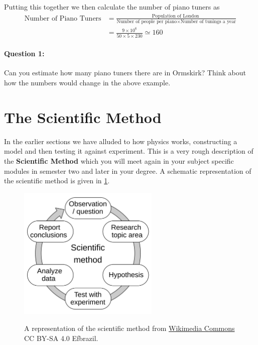 \documentclass[a4paper,12pt]{book}
\begin{document}
Putting this together we then calculate the number of piano tuners as
\begin{align*}
    \text{Number of Piano Tuners} &= \frac{\text{Population of London }}{\text{Number of people per piano} \times \text{Number of tunings a year}}\\
    &=\frac{9\times 10^{6}}{50\times 5\times 230}\simeq 160
\end{align*}

\paragraph{Question 1:}Can you estimate how many piano tuners there are in Ormskirk? Think about how the numbers would change in the above example.\\




\section{The Scientific Method}

In the earlier sections we have alluded to how physics works, constructing a model and then testing it against experiment. This is a very rough description of the \textbf{Scientific Method} which you will meet again in your subject specific modules in semester two and later in your degree. A schematic representation of the scientific method is given in \cref{fig2: scientific method}.

\begin{figure}[ht]
    \centering
    \includegraphics[width=0.6\textwidth,alt={A schematic of the scientific method as a cycle, image from Wikimedia commons.}]{figures/The_Scientific_Method.png}
    \caption{A representation of the scientific method from \href{https://commons.wikimedia.org/wiki/File:The_Scientific_Method.svg}{Wikimedia Commons} CC BY-SA 4.0 Efbrazil.}
    \label{fig2: scientific method}
\end{figure}
\end{document}
